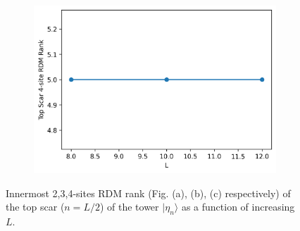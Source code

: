 \documentclass[11pt]{article}
\begin{document}
\begin{itemize}
\begin{itemize}
\begin{figure}[H]
\begin{subfigure}{0.45\textwidth}
        \includegraphics[width=\linewidth]{hb_scar_4e.png}
        \caption{}
        \label{fig:image3hb}
    \end{subfigure}

    \caption{Innermost 2,3,4-sites RDM  rank (Fig. (a), (b), (c) respectively) of the top scar ($n=L/2$) of the tower $|\eta_n\rangle$ as a function of increasing $L$.}
    \label{fig:hb_scars_tower}
\end{figure}


\end{itemize}
\end{itemize}
\end{document}
